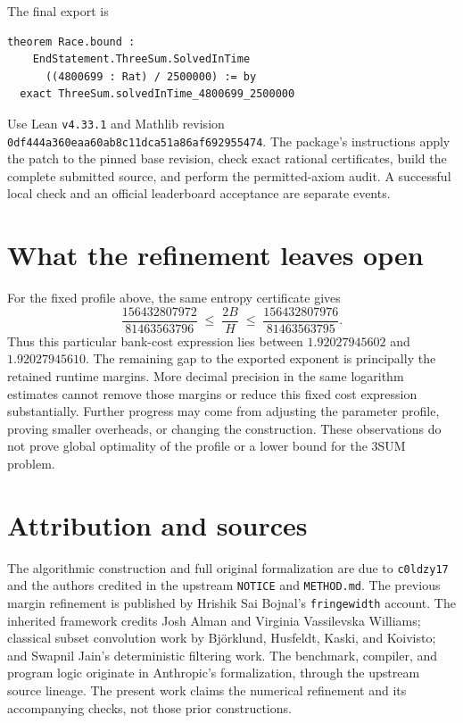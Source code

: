 \documentclass[11pt,a4paper]{article}
\begin{document}
\begin{samepage}
The final export is
\begin{verbatim}
theorem Race.bound :
    EndStatement.ThreeSum.SolvedInTime
      ((4800699 : Rat) / 2500000) := by
  exact ThreeSum.solvedInTime_4800699_2500000
\end{verbatim}
\end{samepage}
Use Lean \texttt{v4.33.1} and Mathlib revision
\texttt{0df444a360eaa60ab8c11dca51a86af692955474}.
The package's instructions apply the patch to the pinned base revision,
check exact rational certificates, build the complete submitted source,
and perform the permitted-axiom audit. A successful local check and an
official leaderboard acceptance are separate events.

\section{What the refinement leaves open}
For the fixed profile above, the same entropy certificate gives
\[
 \frac{156432807972}{81463563796}
 \;\leq\;\frac{2B}{H}\;\leq\;
 \frac{156432807976}{81463563795}.
\]
Thus this particular bank-cost expression lies between
$1.92027945602$ and $1.92027945610$. The remaining gap to the exported
exponent is principally the retained runtime margins. More decimal
precision in the same logarithm estimates cannot remove those margins
or reduce this fixed cost expression substantially. Further progress may
come from adjusting the parameter profile, proving smaller overheads, or
changing the construction. These observations do not prove global
optimality of the profile or a lower bound for the 3SUM problem.

\section*{Attribution and sources}
The algorithmic construction and full original formalization are due to
\texttt{c0ldzy17} and the authors credited in the upstream \texttt{NOTICE}
and \texttt{METHOD.md}. The previous margin refinement is published by
Hrishik Sai Bojnal's \texttt{fringewidth} account. The inherited framework
credits Josh Alman and Virginia Vassilevska Williams; classical subset
convolution work by Bj\"orklund, Husfeldt, Kaski, and Koivisto; and
Swapnil Jain's deterministic filtering work. The benchmark, compiler,
and program logic originate in Anthropic's formalization, through the
upstream source lineage. The present work claims the numerical refinement
and its accompanying checks, not those prior constructions.
\end{document}
